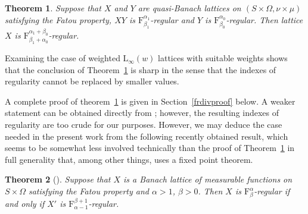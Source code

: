 \documentclass[12pt]{amsart}
\newtheorem {theorem} {Theorem}
\newcommand {\frclass} [2] {\ensuremath{\mathrm F^{#1}_{#2}}}
\newcommand {\lclass} [2] {\ensuremath{\mathrm L_{#1} \left( #2 \right) }}
\newcommand {\weightw} {\ensuremath {\mathit w}}
\begin{document}
\begin {theorem}
\label {frdiv}
Suppose that $X$ and $Y$ are quasi-Banach lattices on $(S \times \Omega, \nu \times \mu)$ satisfying the
Fatou property, $X Y$ is $\frclass {\alpha_1} {\beta_1}$-regular and $Y$ is $\frclass {\alpha_0} {\beta_0}$-regular.
Then lattice $X$ is $\frclass {\alpha_1 + \beta_0} {\beta_1 + \alpha_0}$-regular.
\end {theorem}
Examining the case of
weighted $\lclass {\infty} {\weightw}$ lattices with suitable weights shows that the conclusion
of Theorem~\ref {frdiv} is sharp in the sense that the indexes of regularity cannot be replaced by smaller values.

A complete proof of theorem~\ref {frdiv} is given in Section~\ref {frdivproof} below.
A weaker statement can be obtained
directly from \cite [Theorem~2] {rutsky2011en}; however, the resulting indexes of regularity are too crude for
our purposes.  However, we may deduce the case needed in the present work
from the following recently obtained result,
which seems to be somewhat less involved technically
than the proof of Theorem~\ref {frdiv} in full generality that, among other
things, uses a fixed point theorem.

\begin {theorem} [{\cite [Theorem~14] {rutsky2015cen}}]
\label {frabduality}
Suppose that $X$ is a Banach lattice of measurable functions on $S \times \Omega$ satisfying the Fatou property
and $\alpha > 1$, $\beta > 0$.  Then $X$ is $\frclass {\alpha} {\beta}$-regular if and only if
$X'$ is $\frclass {\beta + 1} {\alpha - 1}$-regular.
\end {theorem}
\end{document}
